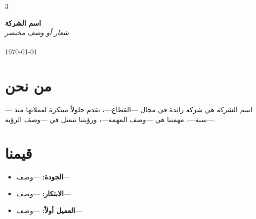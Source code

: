 \documentclass[11pt,a4paper,landscape]{article}
\begin{document}
\thispagestyle{fancy}

\begin{multicols}{3}
\setlength{\columnsep}{1.2em}
\raggedright

\begin{tcolorbox}[enhanced,colback=coverbg,colframe=coverbg,boxrule=0pt,arc=0pt,height=0.95\textheight,left=12pt,right=12pt,top=20pt,bottom=12pt,coltext=white]
\vspace{1.5cm}
\begin{center}
{\Huge\bfseries اسم الشركة}\\[0.8em]
{\large\itshape شعار أو وصف مختصر}\\[2.5em]

\\[2em]

{\small \today}
\end{center}
\vfill
\begin{center}
{\small\itshape {}}
\end{center}
\end{tcolorbox}

\section{من نحن}

اسم الشركة هي شركة رائدة في مجال ---القطاع---،%
تقدم حلولاً مبتكرة لعملائها منذ ---سنة---.%
مهمتنا هي ---وصف المهمة---، ورؤيتنا تتمثل في%
---وصف الرؤية---.

\section{قيمنا}
\begin{itemize}[topsep=0.2em,itemsep=0.15em,leftmargin=1.2em]
    \item \textbf{الجودة:} ---وصف---
    \item \textbf{الابتكار:} ---وصف---
    \item \textbf{العميل أولاً:} ---وصف---
\end{itemize}


\end{multicols}
\end{document}
